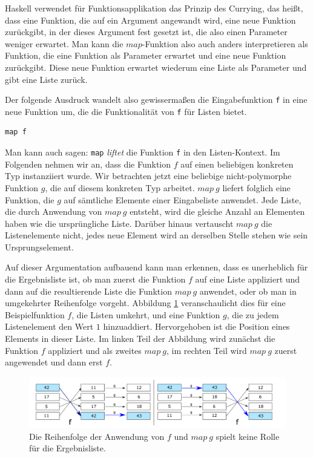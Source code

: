 Haskell verwendet für Funktionsapplikation das Prinzip des Currying, das heißt, dass eine Funktion, die auf ein
Argument angewandt wird, eine neue Funktion zurückgibt, in der dieses Argument fest gesetzt ist, die also einen Parameter weniger erwartet.
Man kann die $map$-Funktion also auch anders interpretieren als Funktion, die eine Funktion als Parameter erwartet und eine
neue Funktion zurückgibt. Diese neue Funktion erwartet wiederum eine Liste als Parameter und gibt eine Liste zurück.

Der folgende Ausdruck wandelt also gewissermaßen die Eingabefunktion \texttt{f} in eine neue Funktion um, die die Funktionalität von
\texttt{f} für Listen bietet.

\begin{verbatim}
map f
\end{verbatim}

Man kann auch sagen: \texttt{map} \textit{liftet} die Funktion \texttt{f} in den Listen-Kontext.
Im Folgenden nehmen wir an, dass die Funktion $f$ auf einen beliebigen konkreten Typ instanziiert wurde.
Wir betrachten jetzt eine beliebige nicht-polymorphe Funktion $g$, die auf diesem konkreten Typ arbeitet. $map\ g$ liefert folglich eine Funktion,
die $g$ auf sämtliche Elemente einer Eingabeliste
anwendet. Jede Liste, die durch Anwendung von $map\ g$ entsteht, wird die gleiche Anzahl an Elementen haben wie die ursprüngliche Liste.
Darüber hinaus vertauscht $map\ g$ die Listenelemente nicht, jedes neue Element wird an derselben Stelle stehen wie
sein Ursprungselement.

Auf dieser Argumentation aufbauend kann man erkennen, dass es unerheblich für die Ergebnisliste ist, ob man zuerst die
Funktion $f$ auf eine Liste appliziert und dann auf die resultierende Liste die Funktion $map\ g$ anwendet, oder ob man
in umgekehrter Reihenfolge vorgeht. Abbildung \ref{fig:fmapg} veranschaulicht dies für eine Beispielfunktion $f$, die Listen
umkehrt, und eine Funktion $g$, die zu jedem Listenelement den Wert $1$ hinzuaddiert. Hervorgehoben ist die Position
eines Elements in dieser Liste. Im linken Teil der Abbildung wird zunächst die Funktion $f$ appliziert und als zweites
$map\ g$, im rechten Teil wird $map\ g$ zuerst angewendet und dann erst $f$.

\begin{figure}[ht]
\centering
\includegraphics[width=430px]{fmapg}
\caption{Die Reihenfolge der Anwendung von $f$ und $map\ g$ spielt keine Rolle für die Ergebnisliste.}
\label{fig:fmapg}
\end{figure}


